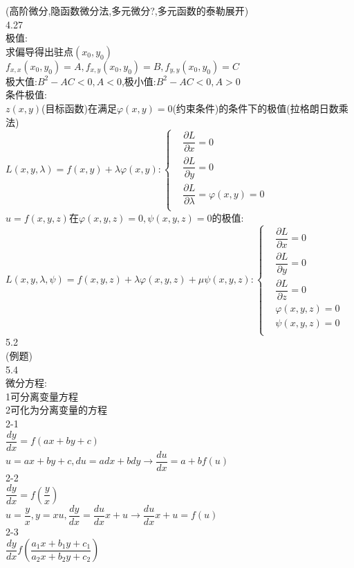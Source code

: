 \documentclass[11pt, a4paper, UTF8]{ctexart}
\begin{document}
(高阶微分,隐函数微分法,多元微分?,多元函数的泰勒展开)\\
4.27\\
极值:\\
求偏导得出驻点$ (x_0,y_0) $\\
$ f_{x,x}(x_0,y_0)=A,f_{x,y}(x_0,y_0)=B,f_{y,y}(x_0,y_0)=C $\\
极大值:$ B^2-AC<0,A<0 $,极小值:$ B^2-AC<0,A>0 $\\
条件极值:\\
$ z(x,y) $(目标函数)在满足$ \varphi(x,y)=0 $(约束条件)的条件下的极值(拉格朗日数乘法)\\
$
L(x,y,\lambda)=f(x,y)+\lambda\varphi(x,y):
\left\{
\begin{aligned}
&\dfrac{\partial L}{\partial x}=0\\
&\dfrac{\partial L}{\partial y}=0\\
&\dfrac{\partial L}{\partial \lambda}=\varphi(x,y)=0\\
\end{aligned}
\right.
$\\
$ u=f(x,y,z) $在$ \varphi(x,y,z)=0,\psi(x,y,z)=0 $的极值:\\
$
L(x,y,\lambda,\psi)=f(x,y,z)+\lambda\varphi(x,y,z)+\mu\psi(x,y,z):
\left\{
\begin{aligned}
&\dfrac{\partial L}{\partial x}=0\\
&\dfrac{\partial L}{\partial y}=0\\
&\dfrac{\partial L}{\partial z}=0\\
&\varphi(x,y,z)=0\\
&\psi(x,y,z)=0\\
\end{aligned}
\right.
$\\
5.2\\
(例题)\\
5.4\\
微分方程:\\
1可分离变量方程\\
2可化为分离变量的方程\\
2-1\\
$\dfrac{dy}{dx}=f(ax+by+c)$\\
$u=ax+by+c,du=adx+bdy\to\dfrac{du}{dx}=a+bf(u)$\\
2-2\\
$\dfrac{dy}{dx}=f(\dfrac{y}{x})$\\
$u=\dfrac{y}{x},y=xu,\dfrac{dy}{dx}=\dfrac{du}{dx}x+u\to\dfrac{du}{dx}x+u=f(u)$\\
2-3\\
$\dfrac{dy}{dx}f(\dfrac{a_1x+b_1y+c_1}{a_2x+b_2y+c_2})$\\
\end{document}
